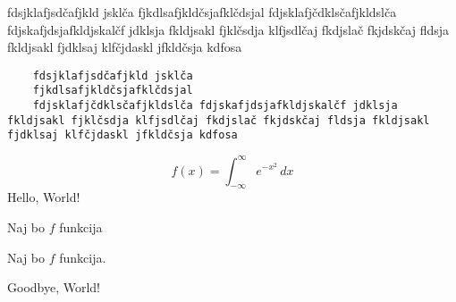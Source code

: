 \documentclass{article}
\begin{document}
fdsjklafjsdčafjkld jsklča
fjkdlsafjkldčsjafklčdsjal
fdjsklafjčdklsčafjkldslča fdjskafjdsjafkldjskalčf jdklsja fkldjsakl fjklčsdja klfjsdlčaj fkdjslač fkjdskčaj fldsja fkldjsakl fjdklsaj klfčjdaskl jfkldčsja kdfosa

\begin{verbatim}
    fdsjklafjsdčafjkld jsklča
    fjkdlsafjkldčsjafklčdsjal
    fdjsklafjčdklsčafjkldslča fdjskafjdsjafkldjskalčf jdklsja fkldjsakl fjklčsdja klfjsdlčaj fkdjslač fkjdskčaj fldsja fkldjsakl fjdklsaj klfčjdaskl jfkldčsja kdfosa
\end{verbatim}
%
\[
f(x) = \int_{-\infty}^{\infty} e^{-x^2}\,dx
\]
Hello, World!

Naj bo $f$ funkcija

Naj bo \(f\) funkcija.

Goodbye, World!
\end{document}
